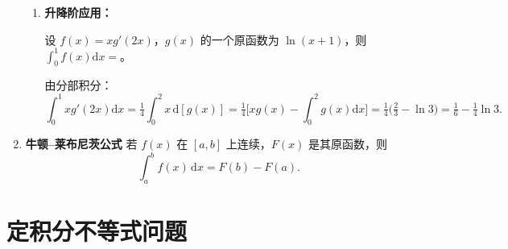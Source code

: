 \begin{enumerate}
\begin{enumerate}
              \item \textbf{升降阶应用：}
                    \begin{example}{}{}
                        设 $f(x)=xg'(2x)$，$g(x)$ 的一个原函数为 $\ln(x+1)$，则 $\displaystyle \int_{0}^{1}f(x)\mathrm{d}x=$\underline{\hspace{2cm}}。
                    \end{example}
                    \begin{solution}
                        由分部积分：
                        \[
                            \int_{0}^{1}xg'(2x)\mathrm{d}x
                            =\tfrac{1}{4}\int_{0}^{2}x\,\mathrm{d}[g(x)]
                            =\tfrac{1}{4}\Big[xg(x)-\!\int_{0}^{2}g(x)\mathrm{d}x\Big]
                            =\tfrac{1}{4}\Big(\tfrac{2}{3}-\ln3\Big)
                            =\tfrac{1}{6}-\tfrac{1}{4}\ln3.
                        \]
                    \end{solution}
          \end{enumerate}

    \item \textbf{牛顿–莱布尼茨公式}
          若 $f(x)$ 在 $[a,b]$ 上连续，$F(x)$ 是其原函数，则
          $$
              \int_{a}^{b}f(x)\,\mathrm{d}x=F(b)-F(a).
          $$
\end{enumerate}
\section{定积分不等式问题}

